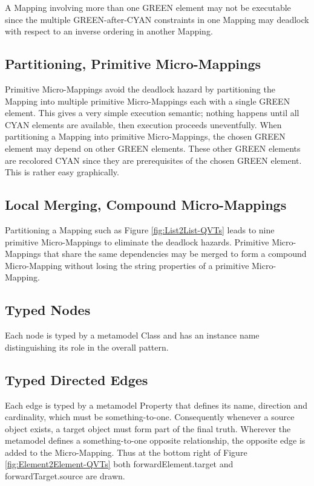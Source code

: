 \documentclass[conference]{IEEEtran}
\begin{document}
A Mapping involving more than one GREEN element may not be executable since the multiple GREEN-after-CYAN constraints in one Mapping may deadlock with respect to an inverse ordering in another Mapping. 

\subsection{Partitioning, Primitive Micro-Mappings}\label{Partitioning}\label{Primitive Micro-Mapping}

Primitive Micro-Mappings avoid the deadlock hazard by partitioning the Mapping into multiple primitive Micro-Mappings each with a single GREEN element. This gives a very simple execution semantic; nothing happens until all CYAN elements are available, then execution proceeds uneventfully. When partitioning a Mapping into primitive Micro-Mappings, the chosen GREEN element may depend on other GREEN elements. These other GREEN elements are recolored CYAN since they are prerequisites of the chosen GREEN element. This is rather easy graphically.  

\subsection{Local Merging, Compound Micro-Mappings}\label{Local Merging}\label{Compound Micro-Mapping}

Partitioning a Mapping such as Figure \ref{fig:List2List-QVTs} leads to nine primitive Micro-Mappings to eliminate the deadlock hazards. Primitive Micro-Mappings that share the same dependencies may be merged to form a compound Micro-Mapping without losing the string properties of a primitive Micro-Mapping.

\subsection{Typed Nodes}

Each node is typed by a metamodel Class and has an instance name distinguishing its role in the overall pattern. 

\subsection{Typed Directed Edges}

Each edge is typed by a metamodel Property that defines its name, direction and cardinality, which must be something-to-one. Consequently whenever a source object exists, a target object must form part of the final truth.
Wherever the metamodel defines a something-to-one opposite relationship, the opposite edge is added to the Micro-Mapping. Thus at the bottom right of Figure \ref{fig:Element2Element-QVTs} both forwardElement.target and forwardTarget.source are drawn.%
\end{document}

